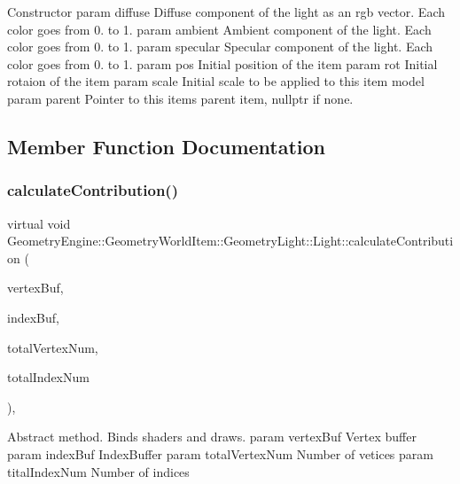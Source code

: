 Constructor param diffuse Diffuse component of the light as an rgb vector. Each color goes from 0. to 1. param ambient Ambient component of the light. Each color goes from 0. to 1. param specular Specular component of the light. Each color goes from 0. to 1. param pos Initial position of the item param rot Initial rotaion of the item param scale Initial scale to be applied to this item model param parent Pointer to this items parent item, nullptr if none. 

\subsection{Member Function Documentation}
\mbox{\label{class_geometry_engine_1_1_geometry_world_item_1_1_geometry_light_1_1_light_a58aa2a3520f7aa2b03afcb4123e7530a}} 
\subsubsection{\texorpdfstring{calculateContribution()}{calculateContribution()}}
{\footnotesize\ttfamily virtual void Geometry\+Engine\+::\+Geometry\+World\+Item\+::\+Geometry\+Light\+::\+Light\+::calculate\+Contribution (\begin{DoxyParamCaption}\item[{Q\+Open\+G\+L\+Buffer $\ast$}]{vertex\+Buf,  }\item[{Q\+Open\+G\+L\+Buffer $\ast$}]{index\+Buf,  }\item[{unsigned int}]{total\+Vertex\+Num,  }\item[{unsigned int}]{total\+Index\+Num }\end{DoxyParamCaption})\hspace{0.3cm}{\ttfamily [protected]}, {}}

Abstract method. Binds shaders and draws. param vertex\+Buf Vertex buffer param index\+Buf Index\+Buffer param total\+Vertex\+Num Number of vetices param tital\+Index\+Num Number of indices 

